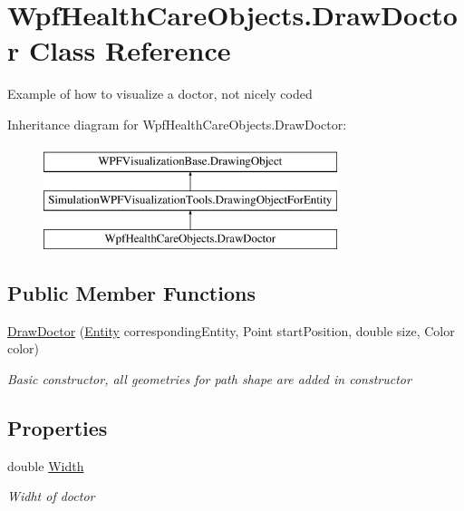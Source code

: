 \hypertarget{class_wpf_health_care_objects_1_1_draw_doctor}{}\section{Wpf\+Health\+Care\+Objects.\+Draw\+Doctor Class Reference}
\label{class_wpf_health_care_objects_1_1_draw_doctor}


Example of how to visualize a doctor, not nicely coded  


Inheritance diagram for Wpf\+Health\+Care\+Objects.\+Draw\+Doctor\+:\begin{figure}[H]
\begin{center}
\leavevmode
\includegraphics[height=3.000000cm]{class_wpf_health_care_objects_1_1_draw_doctor}
\end{center}
\end{figure}
\subsection*{Public Member Functions}
\begin{DoxyCompactItemize}
\item 
\hyperlink{class_wpf_health_care_objects_1_1_draw_doctor_a9f1a426ad234c86822474df9dd0a9311}{Draw\+Doctor} (\hyperlink{class_simulation_core_1_1_h_c_c_m_elements_1_1_entity}{Entity} corresponding\+Entity, Point start\+Position, double size, Color color)
\begin{DoxyCompactList}\small\item\em Basic constructor, all geometries for path shape are added in constructor \end{DoxyCompactList}\end{DoxyCompactItemize}
\subsection*{Properties}
\begin{DoxyCompactItemize}
\item 
double \hyperlink{class_wpf_health_care_objects_1_1_draw_doctor_a4b02889c837ab580d88947d5fd31b744}{Width}
\begin{DoxyCompactList}\small\item\em Widht of doctor \end{DoxyCompactList}\end{DoxyCompactItemize}
